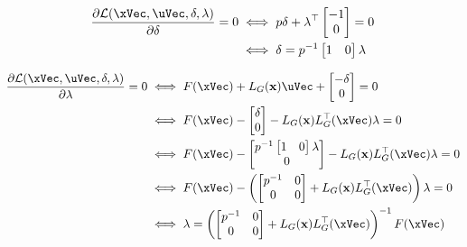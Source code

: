 \begin{align}
    \frac{\partial \mathcal{L}(\xVec, \uVec, \delta, \lambda)}{\partial \delta} = 0 &\iff p\delta +\lambda^{\top}\begin{bmatrix}
                                                                                                                    -1 \\ 0
                                                                                                                 \end{bmatrix} = 0  \notag \\
    &\iff \delta = p^{-1} \begin{bmatrix}
                                1 & 0
                            \end{bmatrix} \lambda   \label{eq:lagrangian_delta_gradient_function}                                                                                                           
\end{align}



\begin{align}
    \frac{\partial \mathcal{L}(\xVec, \uVec, \delta, \lambda)}{\partial \lambda} = 0 &\iff  F(\xVec) + L_G(\mathbf{x})\uVec + \begin{bmatrix} -\delta \\ 0 \end{bmatrix} = 0  \notag \\
    &\iff    F(\xVec) - \begin{bmatrix}  \delta \\ 0 \end{bmatrix} - L_G(\mathbf{x})L_G^{\top}(\xVec)\lambda = 0    \notag \\                                                                                          
    &\iff    F(\xVec) - \begin{bmatrix}  p^{-1} \begin{bmatrix} 1 & 0 \end{bmatrix} \lambda \\ 0 \end{bmatrix} - L_G(\mathbf{x})L_G^{\top}(\xVec)\lambda = 0  \notag \\
    &\iff    F(\xVec) - \left(\begin{bmatrix} p^{-1} & 0 \\ 0 & 0 \end{bmatrix} + L_G(\mathbf{x})L_G^{\top}(\xVec)\right)\lambda = 0  \notag \\     
    &\iff    \lambda = \left(\begin{bmatrix} p^{-1} & 0 \\ 0 & 0 \end{bmatrix} + L_G(\mathbf{x})L_G^{\top}(\xVec)\right)^{-1}F(\xVec) \label{eq:lagrangian_lambda_gradient_function}   
\end{align}

